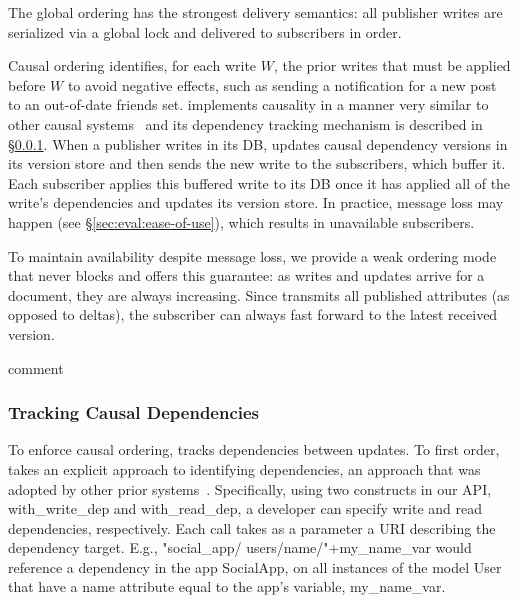 The global ordering has the strongest delivery semantics: all publisher writes are serialized via a global lock and delivered to subscribers in order.

Causal ordering identifies, for each write $W$, the prior writes that must
be applied before $W$ to avoid negative effects, such as sending a notification
for a new post to an out-of-date friends set.
\synapse implements causality in a manner very similar to other
causal systems~\cite{ahamad1995causal, Birman:1991:LCA:128738.128742,
eiger, bolton} and its dependency tracking mechanism is
described in \S\ref{sec:arch:deps}.
When a publisher writes in its DB, \synapse updates causal dependency versions in its
version store and then sends the new write to the subscribers, which buffer it.
Each subscriber applies this buffered write to its DB once it has applied all
of the write's dependencies and updates its version store.
In practice, message loss may happen (see \S\ref{sec:eval:ease-of-use}), which
results in unavailable subscribers.

To maintain availability despite message loss, we provide a weak
ordering mode that never blocks and offers this guarantee: as writes and
updates arrive for a document, they are always increasing.
Since \synapse transmits all published attributes (as opposed to deltas), the subscriber can always fast forward to the latest received version.

   comment

\subsubsection{Tracking Causal Dependencies} \label{sec:arch:deps}

To enforce causal ordering, \synapse tracks dependencies between updates.  To
first order, \synapse takes an explicit approach to identifying
dependencies, an approach that was adopted by other prior systems~\cite{bolton,
cops, Bailis:2012:PDC:2391229.2391251}.  Specifically, using two constructs in
our API, {\code with\_write\_dep} and {\code with\_read\_dep}, a developer
can specify write and read dependencies, respectively.  Each call takes as a
parameter a URI describing the dependency target. E.g.,
{\code"social\_app/ users/name/"+my\_name\_var} would reference a dependency in
the app {\code SocialApp}, on all instances of the model {\code User} that have
a {\code name} attribute equal to the app's variable, {\code my\_name\_var}.

